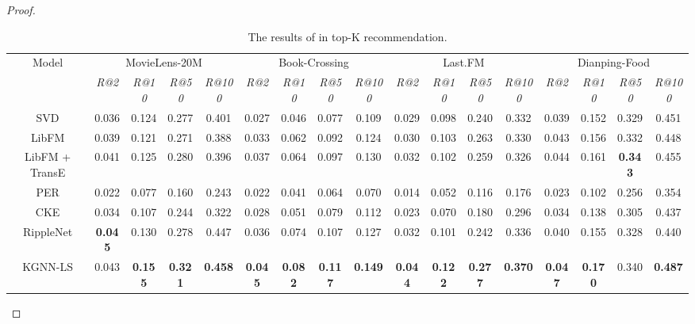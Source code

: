 \documentclass[sigconf]{acmart}
\begin{document}
\begin{proof}
    		\begin{table*}[t]
    			\centering
    			\setlength{\tabcolsep}{2pt}
    			\begin{tabular}{c|cccc|cccc|cccc|cccc}
    				\hline
    				\multirow{2}{*}{Model} & \multicolumn{4}{c|}{MovieLens-20M} & \multicolumn{4}{c|}{Book-Crossing} & \multicolumn{4}{c|}{Last.FM} & \multicolumn{4}{c}{Dianping-Food} \\
            		& \multicolumn{1}{c}{\textit{R@2}} & \multicolumn{1}{c}{\textit{R@10}} & \multicolumn{1}{c}{\textit{R@50}} & \multicolumn{1}{c|}{\textit{R@100}} & \multicolumn{1}{c}{\textit{R@2}} & \multicolumn{1}{c}{\textit{R@10}} & \multicolumn{1}{c}{\textit{R@50}} & \multicolumn{1}{c|}{\textit{R@100}} & \multicolumn{1}{c}{\textit{R@2}} & \multicolumn{1}{c}{\textit{R@10}} & \multicolumn{1}{c}{\textit{R@50}} & \multicolumn{1}{c|}{\textit{R@100}} & \multicolumn{1}{c}{\textit{R@2}} & \multicolumn{1}{c}{\textit{R@10}} & \multicolumn{1}{c}{\textit{R@50}} & \multicolumn{1}{c}{\textit{R@100}} \\
            		\hline
            		SVD & 0.036 & 0.124 & 0.277 & 0.401 & 0.027 & 0.046 & 0.077 & 0.109 & 0.029 & 0.098 & 0.240 & 0.332 & 0.039 & 0.152 & 0.329 & 0.451 \\
            		LibFM & 0.039 & 0.121 & 0.271 & 0.388 & 0.033 & 0.062 & 0.092 & 0.124 & 0.030 & 0.103 & 0.263 & 0.330 & 0.043 & 0.156 & 0.332 & 0.448 \\
            		LibFM + TransE & 0.041 & 0.125 & 0.280 & 0.396 & 0.037 & 0.064 & 0.097 & 0.130 & 0.032 & 0.102 & 0.259 & 0.326 & 0.044 & 0.161 & \textbf{0.343} & 0.455 \\
            		PER & 0.022 & 0.077 & 0.160 & 0.243 & 0.022 & 0.041 & 0.064 & 0.070 & 0.014 & 0.052 & 0.116 & 0.176 & 0.023 & 0.102 & 0.256 & 0.354 \\
            		CKE & 0.034 & 0.107 & 0.244 & 0.322 & 0.028 & 0.051 & 0.079 & 0.112 & 0.023 & 0.070 & 0.180 & 0.296 & 0.034 & 0.138 & 0.305 & 0.437 \\
            		RippleNet & \textbf{0.045} & 0.130 & 0.278 & 0.447 & 0.036 & 0.074 & 0.107 & 0.127 & 0.032 & 0.101 & 0.242 & 0.336 & 0.040 & 0.155 & 0.328 & 0.440 \\
            		\hline
            		KGNN-LS & 0.043 & \textbf{0.155} & \textbf{0.321} & \textbf{0.458} & \textbf{0.045} & \textbf{0.082} & \textbf{0.117} & \textbf{0.149} & \textbf{0.044} & \textbf{0.122} & \textbf{0.277} & \textbf{0.370} & \textbf{0.047} & \textbf{0.170} & 0.340 & \textbf{0.487} \\
            		\hline
				\end{tabular}
				\vspace{0.05in}
				\caption{The results of  in top-K recommendation.}
				\label{table:topk}
				\vspace{-0.1in}
			\end{table*}
			

\end{proof}
\end{document}
